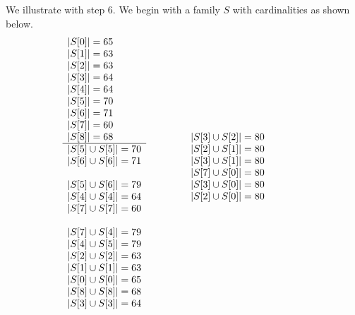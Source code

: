 \documentclass[12pt]{article}
\theoremstyle{definition}
\begin{document}
 
 We illustrate with step $6$.
 We begin with a family $S$ with cardinalities as shown below.
 \[
 \begin{array}[t]{l@{\qquad\qquad}l@{\qquad\qquad}l}
 \begin{array}{l}
|S[0]| = 65 \\
|S[1]| = 63  \\
|S[2]| = 63 \\
|S[3]| = 64 \\
|S[4]| = 64 \\
|S[5]| = 70 \\
|S[6]| = 71 \\
|S[7]| = 60 \\
|S[8]| = 68 \\
\hline
|S[5] \cup S[5]| = 70  \\
|S[6] \cup S[6]| = 71 \\
  \\
|S[5] \cup S[6]| = 79 \\
|S[4] \cup S[4]| = 64 \\
|S[7] \cup S[7]| = 60 \\
  \\
|S[7] \cup S[4]| = 79 \\
|S[4] \cup S[5]| = 79 \\
|S[2] \cup S[2]| = 63 \\
|S[1] \cup S[1]| = 63 \\
|S[0] \cup S[0]| = 65 \\
|S[8] \cup S[8]| = 68 \\
|S[3] \cup S[3]| = 64 \\
  \end{array}
&
  \begin{array}{l}
|S[3] \cup S[2]| = 80 \\
|S[2] \cup S[1]| = 80 \\ 
|S[3] \cup S[1]| = 80 \\
|S[7] \cup S[0]| = 80 \\
|S[3] \cup S[0]| = 80 \\
|S[2] \cup S[0]| = 80 \\
  \\
  

\end{array}
\end{array}\]
\end{document}
